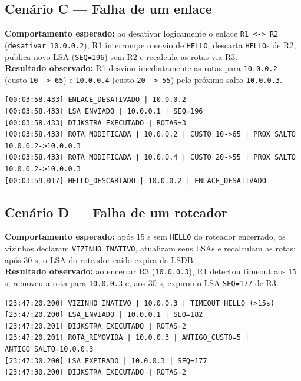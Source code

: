 ﻿\documentclass[11pt,a4paper]{article}
\begin{document}
\subsection{Cenário C --- Falha de um enlace}
\textbf{Comportamento esperado:} ao desativar logicamente o enlace \texttt{R1 <-> R2} (\texttt{desativar 10.0.0.2}), R1 interrompe o envio de \texttt{HELLO}, descarta \texttt{HELLO}s de R2, publica novo LSA (\texttt{SEQ=196}) sem R2 e recalcula as rotas via R3.\\
\textbf{Resultado observado:} R1 desviou imediatamente as rotas para \texttt{10.0.0.2} (custo \texttt{10 -> 65}) e \texttt{10.0.0.4} (custo \texttt{20 -> 55}) pelo próximo salto \texttt{10.0.0.3}.
\begin{lstlisting}
[00:03:58.433] ENLACE_DESATIVADO | 10.0.0.2
[00:03:58.433] LSA_ENVIADO | 10.0.0.1 | SEQ=196
[00:03:58.433] DIJKSTRA_EXECUTADO | ROTAS=3
[00:03:58.433] ROTA_MODIFICADA | 10.0.0.2 | CUSTO 10->65 | PROX_SALTO 10.0.0.2->10.0.0.3
[00:03:58.433] ROTA_MODIFICADA | 10.0.0.4 | CUSTO 20->55 | PROX_SALTO 10.0.0.2->10.0.0.3
[00:03:59.017] HELLO_DESCARTADO | 10.0.0.2 | ENLACE_DESATIVADO
\end{lstlisting}

\subsection{Cenário D --- Falha de um roteador}
\textbf{Comportamento esperado:} após 15 s sem \texttt{HELLO} do roteador encerrado, os vizinhos declaram \texttt{VIZINHO\_INATIVO}, atualizam seus LSAs e recalculam as rotas; após 30 s, o LSA do roteador caído expira da LSDB.\\
\textbf{Resultado observado:} ao encerrar R3 (\texttt{10.0.0.3}), R1 detectou timeout aos 15 s, removeu a rota para \texttt{10.0.0.3} e, aos 30 s, expirou o LSA \texttt{SEQ=177} de R3.
\begin{lstlisting}
[23:47:20.200] VIZINHO_INATIVO | 10.0.0.3 | TIMEOUT_HELLO (>15s)
[23:47:20.200] LSA_ENVIADO | 10.0.0.1 | SEQ=182
[23:47:20.201] DIJKSTRA_EXECUTADO | ROTAS=2
[23:47:20.201] ROTA_REMOVIDA | 10.0.0.3 | ANTIGO_CUSTO=5 | ANTIGO_SALTO=10.0.0.3
[23:47:30.200] LSA_EXPIRADO | 10.0.0.3 | SEQ=177
[23:47:30.200] DIJKSTRA_EXECUTADO | ROTAS=2
\end{lstlisting}
\end{document}
